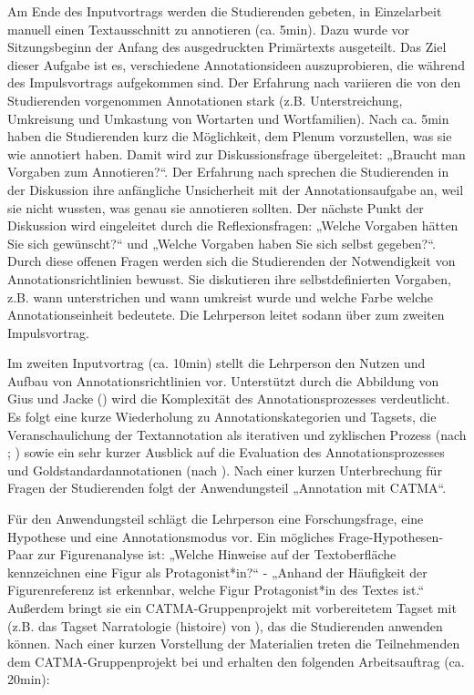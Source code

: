 \documentclass[
          a4paper,
        ]{article}
\begin{document}
Am Ende des Inputvortrags werden die Studierenden gebeten, in
Einzelarbeit manuell einen Textausschnitt zu annotieren (ca. 5min). Dazu
wurde vor Sitzungsbeginn der Anfang des ausgedruckten Primärtexts
ausgeteilt. Das Ziel dieser Aufgabe ist es, verschiedene
Annotationsideen auszuprobieren, die während des Impulsvortrags
aufgekommen sind. Der Erfahrung nach variieren die von den Studierenden
vorgenommen Annotationen stark (z.B. Unterstreichung, Umkreisung und
Umkastung von Wortarten und Wortfamilien). Nach ca. 5min haben die
Studierenden kurz die Möglichkeit, dem Plenum vorzustellen, was sie wie
annotiert haben. Damit wird zur Diskussionsfrage übergeleitet: „Braucht
man Vorgaben zum Annotieren?``. Der Erfahrung nach sprechen die
Studierenden in der Diskussion ihre anfängliche Unsicherheit mit der
Annotationsaufgabe an, weil sie nicht wussten, was genau sie annotieren
sollten. Der nächste Punkt der Diskussion wird eingeleitet durch die
Reflexionsfragen: „Welche Vorgaben hätten Sie sich gewünscht?`` und
„Welche Vorgaben haben Sie sich selbst gegeben?``. Durch diese offenen
Fragen werden sich die Studierenden der Notwendigkeit von
Annotationsrichtlinien bewusst. Sie diskutieren ihre selbstdefinierten
Vorgaben, z.B. wann unterstrichen und wann umkreist wurde und welche
Farbe welche Annotationseinheit bedeutete. Die Lehrperson leitet sodann
über zum zweiten Impulsvortrag.

Im zweiten Inputvortrag (ca. 10min) stellt die Lehrperson den Nutzen und
Aufbau von Annotationsrichtlinien vor. Unterstützt durch die Abbildung
von Gius und Jacke () wird die
Komplexität des Annotationsprozesses verdeutlicht. Es folgt eine kurze
Wiederholung zu Annotationskategorien und Tagsets, die Veranschaulichung
der Textannotation als iterativen und zyklischen Prozess (nach
;
) sowie ein sehr kurzer Ausblick auf die Evaluation des
Annotationsprozesses und Goldstandardannotationen (nach
). Nach einer kurzen Unterbrechung für Fragen der Studierenden
folgt der Anwendungsteil „Annotation mit CATMA``.

Für den Anwendungsteil schlägt die Lehrperson eine Forschungsfrage, eine
Hypothese und eine Annotationsmodus vor. Ein mögliches
Frage-Hypothesen-Paar zur Figurenanalyse ist: „Welche Hinweise auf der
Textoberfläche kennzeichnen eine Figur als Protagonist*in?`` - „Anhand
der Häufigkeit der Figurenreferenz ist erkennbar, welche Figur
Protagonist*in des Textes ist.`` Außerdem bringt sie ein
CATMA-Gruppenprojekt mit vorbereitetem Tagset mit (z.B. das Tagset
Narratologie (histoire) von
), das die
Studierenden anwenden können. Nach einer kurzen Vorstellung der
Materialien treten die Teilnehmenden dem CATMA-Gruppenprojekt bei und
erhalten den folgenden Arbeitsauftrag (ca. 20min):
\end{document}
